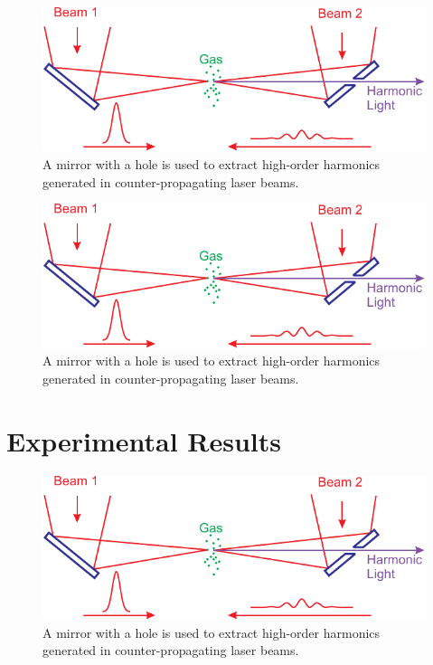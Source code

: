 \documentclass[oneside, astronomy, noacknowlegments]{BYUPhys}
\begin{document}
\begin{figure}
    \centerline{\includegraphics{Graphic1}}
    \caption[ODMR computational model for SiC]{\label{fig:SiCModel}
     A mirror with a hole is used to extract high-order harmonics generated in
     counter-propagating laser beams.}
 \end{figure}

\begin{figure}
    \centerline{\includegraphics{Graphic1}}
    \caption[ODMR computational model for CdTe]{\label{fig:CdTeModel}
     A mirror with a hole is used to extract high-order harmonics generated in
     counter-propagating laser beams.}
 \end{figure}

\section{Experimental Results}

\begin{figure}
    \centerline{\includegraphics{Graphic1}}
    \caption[Experimental ODMR for SiC]{\label{fig:SiCResults}
     A mirror with a hole is used to extract high-order harmonics generated in
     counter-propagating laser beams.}
 \end{figure}
\end{document}
